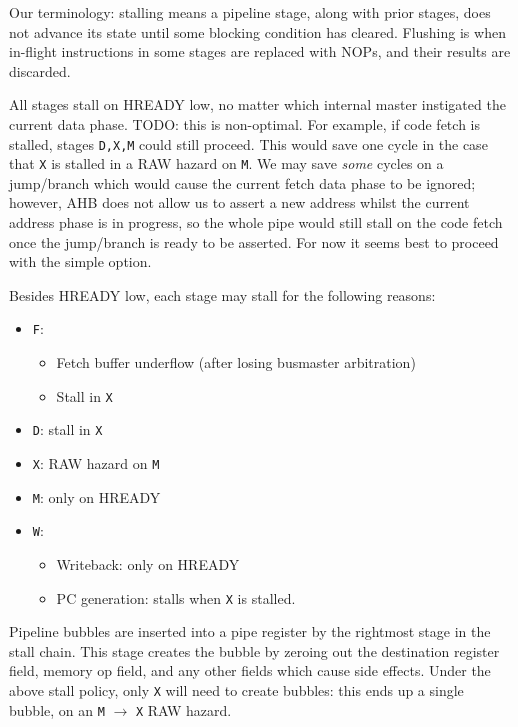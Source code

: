 \documentclass{article}
\begin{document}
Our terminology: stalling means a pipeline stage, along with prior stages, does not advance its state until some blocking condition has cleared. Flushing is when in-flight instructions in some stages are replaced with NOPs, and their results are discarded.

All stages stall on HREADY low, no matter which internal master instigated the current data phase. TODO: this is non-optimal. For example, if code fetch is stalled, stages \texttt{D,X,M} could still proceed. This would save one cycle in the case that \texttt{X} is stalled in a RAW hazard on \texttt{M}. We may save \textit{some} cycles on a jump/branch which would cause the current fetch data phase to be ignored; however, AHB does not allow us to assert a new address whilst the current address phase is in progress, so the whole pipe would still stall on the code fetch once the jump/branch is ready to be asserted. For now it seems best to proceed with the simple option.

Besides HREADY low, each stage may stall for the following reasons:

\begin{itemize}
	\item \texttt{F}:
	\begin{itemize}
		\item Fetch buffer underflow (after losing busmaster arbitration)
		\item  Stall in \texttt{X}
	\end{itemize}
	\item \texttt{D}: stall in \texttt{X}
	\item \texttt{X}: RAW hazard on \texttt{M}
	\item \texttt{M}: only on HREADY
	\item \texttt{W}:
	\begin{itemize}
		\item Writeback: only on HREADY
		\item PC generation: stalls when \texttt{X} is stalled.
	\end{itemize}
\end{itemize}

Pipeline bubbles are inserted into a pipe register by the rightmost stage in the stall chain. This stage creates the bubble by zeroing out the destination register field, memory op field, and any other fields which cause side effects. Under the above stall policy, only \texttt{X} will need to create bubbles: this ends up a single bubble, on an \texttt{M} $\to$ \texttt{X} RAW hazard.
\end{document}
